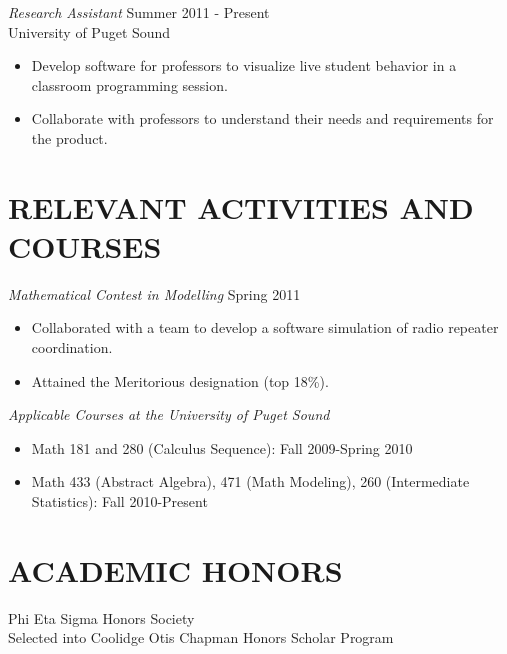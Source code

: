 \documentclass[line,margin,11pt]{res}
\begin{document}
\begin{resume}
{\sl Research Assistant} \hfill        
    Summer 2011 - Present \\
        University of Puget Sound\\
        \begin{itemize}
        \item Develop software for professors to visualize live student 
          behavior in a classroom programming session.
        \item Collaborate with professors to understand their needs and 
          requirements for the product.
        \end{itemize}
  
\vspace*{.1cm}


\section{RELEVANT ACTIVITIES AND\\ COURSES}
{\sl Mathematical Contest in Modelling} \hfill Spring 2011
 		\begin{itemize}
 		\item Collaborated with a team to develop a software simulation
                  of radio repeater coordination.
 		\item Attained the Meritorious designation (top 18\%).
 		\end{itemize}

{\sl Applicable Courses at the University of Puget Sound} \hfill
\begin{itemize}
        \item Math 181 and 280 (Calculus Sequence): Fall 2009-Spring 2010
        \item Math 433 (Abstract Algebra), 471 (Math Modeling), 260 
          (Intermediate Statistics): Fall 2010-Present
\end{itemize}	
\vspace*{.1cm}
 	
\section{ACADEMIC HONORS}
	Phi Eta Sigma Honors Society\\
	Selected into Coolidge Otis Chapman Honors Scholar Program
	

\end{resume}





\end{document}
